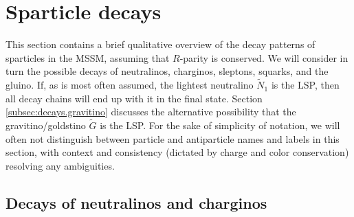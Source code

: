 \documentclass[11pt]{article}
\def\stilde{\widetilde}
\def\G{\stilde G}
\def\NI{\stilde N_1}
\begin{document}
\section{Sparticle decays}\label{sec:decays}
\setcounter{equation}{0}
\setcounter{figure}{0}
\setcounter{table}{0}
\setcounter{footnote}{1}

This section contains a brief qualitative overview of the decay patterns
of sparticles in the MSSM, assuming that $R$-parity is conserved. We will 
consider in turn the possible decays of neutralinos, charginos, sleptons, 
squarks, and the gluino. If, as is most often assumed, the lightest 
neutralino $\NI$ is the LSP, then all decay chains will end up with it in 
the final state. Section \ref{subsec:decays.gravitino} discusses the 
alternative possibility that the gravitino/goldstino $\G$ is the LSP. 
For the sake of simplicity of notation, we will often not distinguish
between particle and antiparticle names and labels in this section, with
context and consistency (dictated by charge and color conservation)
resolving any ambiguities. 

\subsection{Decays of neutralinos and
charginos}\label{subsec:decays.inos}
\setcounter{equation}{0}
\setcounter{footnote}{1}
\end{document}
